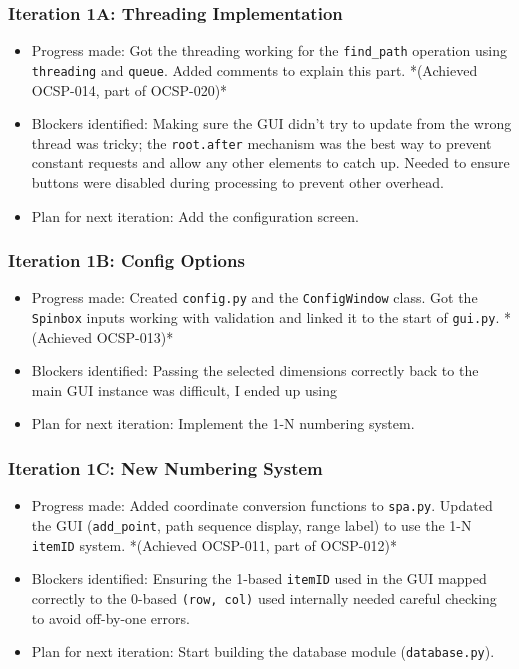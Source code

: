 \subsubsection{Iteration 1A: Threading Implementation}
\begin{itemize}
	\item Progress made: Got the threading working for the \verb|find_path| operation using \verb|threading| and \verb|queue|. Added comments to explain this part. *(Achieved OCSP-014, part of OCSP-020)*
	\item Blockers identified: Making sure the GUI didn't try to update from the wrong thread was tricky; the \verb|root.after| mechanism was the best way to prevent constant requests and allow any other elements to catch up. Needed to ensure buttons were disabled during processing to prevent other overhead.
	\item Plan for next iteration: Add the configuration screen.
\end{itemize}

\subsubsection{Iteration 1B: Config Options}
\begin{itemize}
	\item Progress made: Created \verb|config.py| and the \verb|ConfigWindow| class. Got the \verb|Spinbox| inputs working with validation and linked it to the start of \verb|gui.py|. *(Achieved OCSP-013)*
	\item Blockers identified: Passing the selected dimensions correctly back to the main GUI instance was difficult, I ended up using 
	\item Plan for next iteration: Implement the 1-N numbering system.
\end{itemize}

\subsubsection{Iteration 1C: New Numbering System}
\begin{itemize}
	\item Progress made: Added coordinate conversion functions to \verb|spa.py|. Updated the GUI (\verb|add_point|, path sequence display, range label) to use the 1-N \verb|itemID| system. *(Achieved OCSP-011, part of OCSP-012)*
	\item Blockers identified: Ensuring the 1-based \verb|itemID| used in the GUI mapped correctly to the 0-based \verb|(row, col)| used internally needed careful checking to avoid off-by-one errors.
	\item Plan for next iteration: Start building the database module (\verb|database.py|).
\end{itemize}

